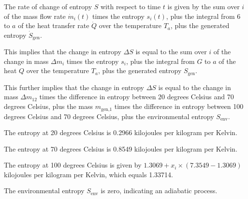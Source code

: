 The rate of change of entropy \( S \) with respect to time \( t \) is given by the sum over \( i \) of the mass flow rate \( \dot{m}_{i}(t) \) times the entropy \( s_{i}(t) \), plus the integral from 6 to \( a \) of the heat transfer rate \( \dot{Q} \) over the temperature \( T_{a} \), plus the generated entropy \( \dot{S}_{\text{gen}} \).

This implies that the change in entropy \( \Delta S \) is equal to the sum over \( i \) of the change in mass \( \Delta m_{i} \) times the entropy \( s_{i} \), plus the integral from \( G \) to \( a \) of the heat \( Q \) over the temperature \( T_{a} \), plus the generated entropy \( S_{\text{gen}} \).

This further implies that the change in entropy \( \Delta S \) is equal to the change in mass \( \Delta m_{12} \) times the difference in entropy between 20 degrees Celsius and 70 degrees Celsius, plus the mass \( m_{\text{gen,1}} \) times the difference in entropy between 100 degrees Celsius and 70 degrees Celsius, plus the environmental entropy \( S_{\text{env}} \).

The entropy at 20 degrees Celsius is 0.2966 kilojoules per kilogram per Kelvin.

The entropy at 70 degrees Celsius is 0.8549 kilojoules per kilogram per Kelvin.

The entropy at 100 degrees Celsius is given by \( 1.3069 + x_{i} \times (7.3549 - 1.3069) \) kilojoules per kilogram per Kelvin, which equals 1.33714.

The environmental entropy \( S_{\text{env}} \) is zero, indicating an adiabatic process.